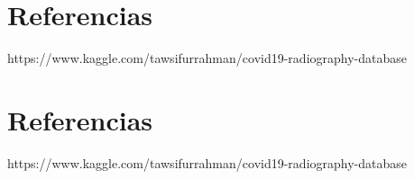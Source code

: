 \documentclass[11pt,a4paper]{article}
\theoremstyle{definition}
\begin{document}
\section{Referencias}

https://www.kaggle.com/tawsifurrahman/covid19-radiography-database


\section{Referencias}

https://www.kaggle.com/tawsifurrahman/covid19-radiography-database
\end{document}
